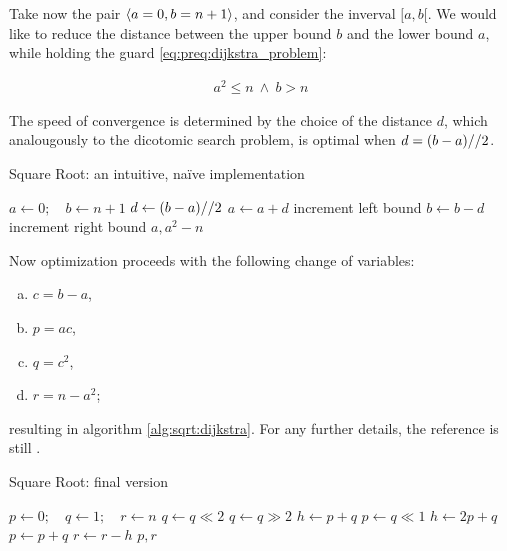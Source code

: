 Take now the pair $\langle a=0, b=n+1\rangle$, and consider the inverval
$[a, b[$. We would like to reduce the distance between the upper bound $b$ and
the lower bound $a$, while holding the guard \ref{eq:preq:dijkstra_problem}:

\begin{align*}
  a^2 \leq n \: \land \: b > n
\end{align*}

The speed of convergence is determined by the choice of the distance $d$, which
analougously to the dicotomic search problem, is optimal when
$d = (b-a) // 2$.

\begin{algorithm}[H]
  \caption{Square Root: an intuitive, na\"ive implementation}
  \label{alg:sqrt:dijkstra_naif}
  \begin{algorithmic}[1]
    \State $a \gets 0; \quad b \gets n+1$
      \State $d \gets (b-a) // 2$
       $a \gets a+d$
      \Comment increment left bound
       $b \gets b-d$
      \Comment increment right bound
      \EndIf
    \EndWhile
    \State \Return $a, a^2-n$
    \EndFunction
  \end{algorithmic}
\end{algorithm}
Now optimization proceeds with the following change of variables:
\begin{enumerate}[a)]
  \setlength{\itemsep}{1pt}
  \setlength{\parskip}{0pt}
  \setlength{\parsep}{0pt}
\item $c = b-a$,
\item $p = ac$,
\item $q = c^2$,
\item $r = n-a^2$;
\end{enumerate}
resulting in algorithm \ref{alg:sqrt:dijkstra}.
For any further details, the reference is still \cite{Dijkstra:adop}.

\begin{algorithm}[H]
  \caption{Square Root: final version}
  \label{alg:sqrt:dijkstra}
  \begin{algorithmic}[1]
    \State $p \gets 0; \quad q \gets 1; \quad r \gets n$
     $q \gets q \ll 2$ \EndWhile
      \State $q \gets q \gg 2$
      \State $h \gets p+q$
      \State $p \gets q \ll 1$
      \State $h \gets 2p + q$
        \State $p \gets p+q$
        \State $r \gets r-h$ \EndIf
    \EndWhile
    \State \Return $p, r$
    \EndFunction
  \end{algorithmic}
\end{algorithm}

